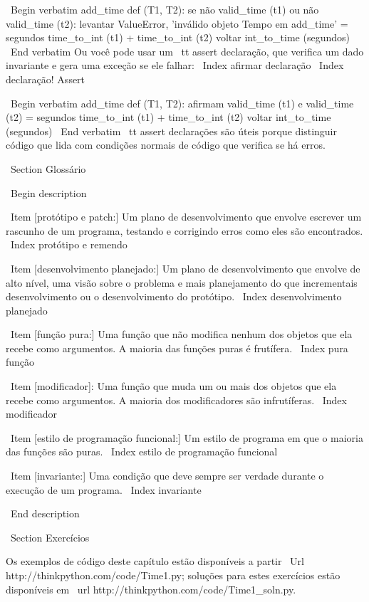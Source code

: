 \documentclass[10pt]{book}
\begin{document}
\begin {itemize}
{{{{{{{{{{{{{{\ Begin {verbatim}
add_time def (T1, T2):
    se não valid_time (t1) ou não valid_time (t2):
        levantar ValueError, 'inválido objeto Tempo em add_time'
    = segundos time_to_int (t1) + time_to_int (t2)
    voltar int_to_time (segundos)
\ End {verbatim}
%
Ou você pode usar um {\ tt assert} declaração, que verifica um dado invariante
e gera uma exceção se ele falhar:
\ Index {afirmar declaração}
\ Index {declaração! Assert}

\ Begin {verbatim}
add_time def (T1, T2):
    afirmam valid_time (t1) e valid_time (t2)
    = segundos time_to_int (t1) + time_to_int (t2)
    voltar int_to_time (segundos)
\ End {verbatim}
%
{\ tt assert} declarações são úteis porque distinguir
código que lida com condições normais de código
que verifica se há erros.


\ Section {} Glossário

\ Begin {description}

\ Item [protótipo e patch:] Um plano de desenvolvimento que envolve
escrever um rascunho de um programa, testando e corrigindo erros como
eles são encontrados.
\ Index {protótipo e remendo}

\ Item [desenvolvimento planejado:] Um plano de desenvolvimento que envolve
de alto nível, uma visão sobre o problema e mais planejamento do que incrementais
desenvolvimento ou o desenvolvimento do protótipo.
\ Index {desenvolvimento planejado}

\ Item [função pura:] Uma função que não modifica nenhum dos objetos que ela
recebe como argumentos. A maioria das funções puras é frutífera.
\ Index {pura função}

\ Item [modificador]: Uma função que muda um ou mais dos objetos que ela
recebe como argumentos. A maioria dos modificadores são infrutíferas.
\ Index {} modificador

\ Item [estilo de programação funcional:] Um estilo de programa em que o
maioria das funções são puras.
\ Index {estilo de programação funcional}

\ Item [invariante:] Uma condição que deve sempre ser verdade durante o
execução de um programa.
\ Index {} invariante

\ End {description}


\ Section {Exercícios}

Os exemplos de código deste capítulo estão disponíveis a partir
\ Url {http://thinkpython.com/code/Time1.py}; soluções para estes
exercícios estão disponíveis em \ url {http://thinkpython.com/code/Time1_soln.py}.

}}}}}}}}}}}}}}
\end{itemize}
\end{document}
